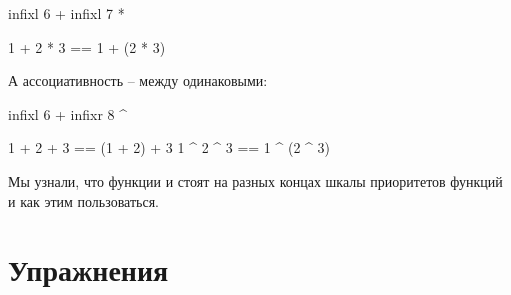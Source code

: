\begin{code}
infixl 6 +
infixl 7 *

1 + 2 * 3 == 1 + (2 * 3)
\end{code}

А ассоциативность -- между одинаковыми:

\begin{code}
infixl 6 +
infixr 8 ^

1 + 2 + 3 == (1 + 2) + 3    
1 ^ 2 ^ 3 ==  1 ^ (2 ^ 3)  
\end{code}

Мы узнали, что функции \In{($)} и  стоят на разных
концах шкалы приоритетов функций и как этим пользоваться. 

\section{Упражнения}

